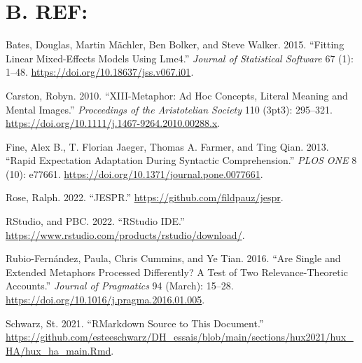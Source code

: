 \documentclass[
]{article}
\newlength{\cslhangindent}
\newlength{\cslentryspacingunit} %
\newenvironment{CSLReferences}[2] %
 {%
  \setlength{\parindent}{0pt}
  \ifodd #1
  \let\oldpar\par
  \def\par{\hangindent=\cslhangindent\oldpar}
  \fi
  \setlength{\parskip}{#2\cslentryspacingunit}
 }%
 {}
\begin{document}
\hypertarget{b.-ref}{%
\section*{B. REF:}\label{b.-ref}}

\hypertarget{refs}{}
\begin{CSLReferences}{1}{0}
\leavevmode{}%
Bates, Douglas, Martin Mächler, Ben Bolker, and Steve Walker. 2015. {``Fitting {Linear} {Mixed}-{Effects} {Models} {Using} Lme4.''} \emph{Journal of Statistical Software} 67 (1): 1--48. \url{https://doi.org/10.18637/jss.v067.i01}.

\leavevmode{}%
Carston, Robyn. 2010. {``{XIII}-{Metaphor}: {Ad} {Hoc} {Concepts}, {Literal} {Meaning} and {Mental} {Images}.''} \emph{Proceedings of the Aristotelian Society} 110 (3pt3): 295--321. \url{https://doi.org/10.1111/j.1467-9264.2010.00288.x}.

\leavevmode{}%
Fine, Alex B., T. Florian Jaeger, Thomas A. Farmer, and Ting Qian. 2013. {``Rapid {Expectation} {Adaptation} During {Syntactic} {Comprehension}.''} \emph{PLOS ONE} 8 (10): e77661. \url{https://doi.org/10.1371/journal.pone.0077661}.

\leavevmode{}%
Rose, Ralph. 2022. {``{JESPR}.''} \url{https://github.com/fildpauz/jespr}.

\leavevmode{}%
RStudio, and PBC. 2022. {``{RStudio} {IDE}.''} \url{https://www.rstudio.com/products/rstudio/download/}.

\leavevmode{}%
Rubio-Fernández, Paula, Chris Cummins, and Ye Tian. 2016. {``Are Single and Extended Metaphors Processed Differently? {A} Test of Two {Relevance}-{Theoretic} Accounts.''} \emph{Journal of Pragmatics} 94 (March): 15--28. \url{https://doi.org/10.1016/j.pragma.2016.01.005}.

\leavevmode{}%
Schwarz, St. 2021. {``{RMarkdown} Source to This Document.''} \url{https://github.com/esteeschwarz/DH_essais/blob/main/sections/hux2021/hux_HA/hux_ha_main.Rmd}.

\end{CSLReferences}
\end{document}
